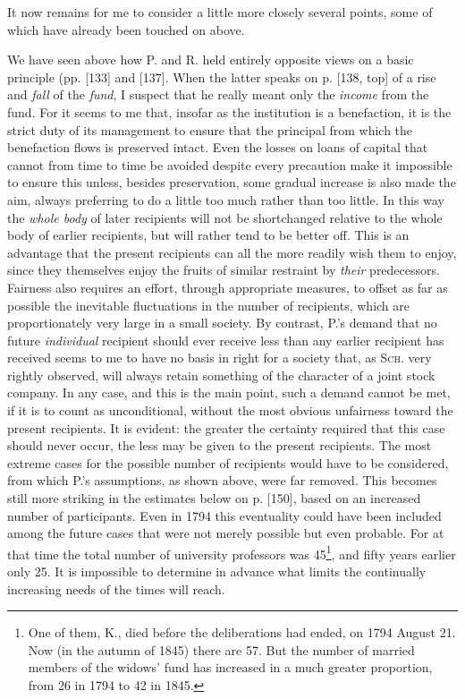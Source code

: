 \par{}
It now remains for me to consider a little more closely several points, some of which have already been touched on above.

We have seen above how P. and R. held entirely opposite views on a basic principle (pp. [133] and [137]. When the latter speaks on p. [138, top] of a rise and \textit{fall} of the \textit{fund}, I suspect that he really meant only the \textit{income} from the fund. For it seems to me that, insofar as the institution is a benefaction, it is the strict duty of its management to ensure that the principal from which the benefaction flows is preserved intact. Even the losses on loans of capital that cannot from time to time be avoided despite every precaution make it impossible to ensure this unless, besides preservation, some gradual increase is also made the aim, always preferring to do a little too much rather than too little. In this way the \textit{whole body} of later recipients will not be shortchanged relative to the whole body of earlier recipients, but will rather tend to be better off. This is an advantage that the present recipients can all the more readily wish them to enjoy, since they themselves enjoy the fruits of similar restraint by \textit{their} predecessors. Fairness also requires an effort, through appropriate measures, to offset as far as possible the inevitable fluctuations in the number of recipients, which are proportionately very large in a small society. By contrast, P.'s demand that no future \textit{individual} recipient should ever receive less than any earlier recipient has received seems to me to have no basis in right for a society that, as \textsc{Sch.} very rightly observed, will always retain something of the character of a joint stock company. In any case, and this is the main point, such a demand cannot be met, if it is to count as unconditional, without the most obvious unfairness toward the present recipients. It is evident: the greater the certainty required that this case should never occur, the less may be given to the present recipients. The most extreme cases for the possible number of recipients would have to be considered, from which P.'s assumptions, as shown above, were far removed. This becomes still more striking in the estimates below on p. [150], based on an increased number of participants. Even in 1794 this eventuality could have been included among the future cases that were not merely possible but even probable. For at that time the total number of university professors was 45\footnote{One of them, K., died before the deliberations had ended, on 1794 August 21. Now (in the autumn of 1845) there are 57. But the number of married members of the widows' fund has increased in a much greater proportion, from 26 in 1794 to 42 in 1845.}, and fifty years earlier only 25. It is impossible to determine in advance what limits the continually increasing needs of the times will reach.

